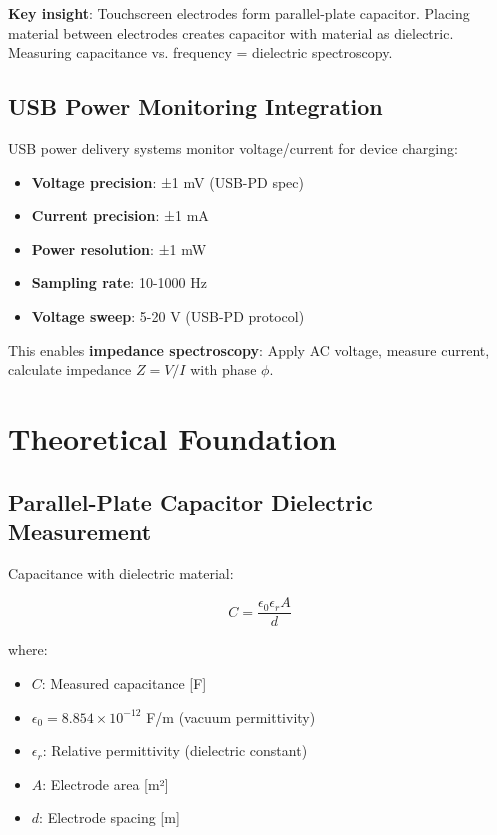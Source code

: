 \documentclass[12pt,a4paper]{article}
\begin{document}
\textbf{Key insight}: Touchscreen electrodes form parallel-plate capacitor. Placing material between electrodes creates capacitor with material as dielectric. Measuring capacitance vs. frequency = dielectric spectroscopy.

\subsection{USB Power Monitoring Integration}

USB power delivery systems monitor voltage/current for device charging:

\begin{itemize}
\item \textbf{Voltage precision}: ±1 mV (USB-PD spec)
\item \textbf{Current precision}: ±1 mA
\item \textbf{Power resolution}: ±1 mW
\item \textbf{Sampling rate}: 10-1000 Hz
\item \textbf{Voltage sweep}: 5-20 V (USB-PD protocol)
\end{itemize}

This enables \textbf{impedance spectroscopy}: Apply AC voltage, measure current, calculate impedance $Z = V/I$ with phase $\phi$.

\section{Theoretical Foundation}

\subsection{Parallel-Plate Capacitor Dielectric Measurement}

Capacitance with dielectric material:

\begin{equation}
C = \frac{\epsilon_0 \epsilon_r A}{d}
\end{equation}

where:
\begin{itemize}
\item $C$: Measured capacitance [F]
\item $\epsilon_0 = 8.854 \times 10^{-12}$ F/m (vacuum permittivity)
\item $\epsilon_r$: Relative permittivity (dielectric constant)
\item $A$: Electrode area [m²]
\item $d$: Electrode spacing [m]
\end{itemize}
\end{document}
